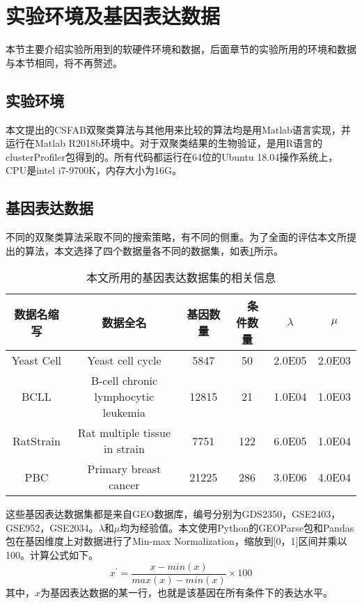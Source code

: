 \section{实验环境及基因表达数据}
本节主要介绍实验所用到的软硬件环境和数据，后面章节的实验所用的环境和数据与本节相同，将不再赘述。
    \subsection{实验环境}
    本文提出的CSFAB双聚类算法与其他用来比较的算法均是用Matlab语言实现，并运行在Matlab R2018b环境中。对于双聚类结果的生物验证，是用R语言的clusterProfiler包得到的。所有代码都运行在64位的Ubuntu 18.04操作系统上，CPU是intel i7-9700K，内存大小为16G。

    \subsection{基因表达数据}
    不同的双聚类算法采取不同的搜索策略，有不同的侧重。为了全面的评估本文所提出的算法，本文选择了四个数据量各不同的数据集，如表\ref{tab:data}所示。
    \begin{table}[htbp]
    \caption{本文所用的基因表达数据集的相关信息}\label{tab:data}
    \vspace{0.5em}\centering\wuhao
    \begin{tabular}{cccccc}
    \toprule[1.5pt]
    数据名缩写 & 数据全名 & 基因数量 &　条件数量 & $\lambda$& $\mu$ \\
    \midrule[1pt]
    Yeast Cell & Yeast cell cycle & 5847& 50 & 2.0E05 &  2.0E03\\
    BCLL & B-cell chronic lymphocytic leukemia& 12815& 21 & 1.0E04 & 1.0E03\\
    RatStrain & Rat multiple tissue in strain& 7751& 122 & 6.0E05 & 1.0E04\\
    PBC & Primary breast cancer& 21225& 286 & 3.0E06 & 4.0E04\\
    \bottomrule[1.5pt]
    \end{tabular}
    \end{table}
    这些基因表达数据集都是来自GEO数据库，编号分别为GDS2350，GSE2403，GSE952，GSE2034。$\lambda$和$\mu$均为经验值。本文使用Python的GEOParse包和Pandas包在基因维度上对数据进行了Min-max Normalization，缩放到[0，1]区间并乘以100。计算公式如下。
    \begin{equation}
        x^{\prime} = \frac{x - min(x)}{max(x) - min(x)} \times 100
    \end{equation}
    其中，$x$为基因表达数据的某一行，也就是该基因在所有条件下的表达水平。

